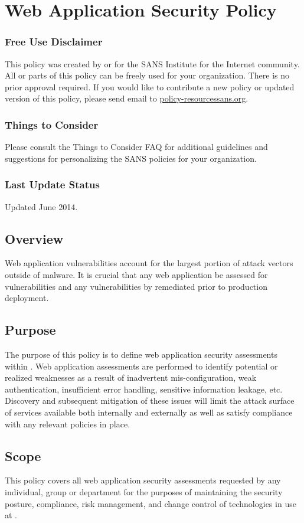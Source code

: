 \chapter{Web Application Security Policy}
\setcounter{section}{0}
\subsection*{Free Use Disclaimer}
This policy was created by or for the SANS Institute for the Internet community.  
All or parts of this policy can be freely used for your organization.  
There is no prior approval required. If you would like to contribute a new policy or updated version of this policy, please send email to \href{mailto:policy-resources@sans.org}{policy-resources\at{}sans.org}.
\subsection*{Things to Consider}
Please consult the Things to Consider FAQ for additional guidelines and suggestions for personalizing the SANS policies for your organization.  
\subsection*{Last Update Status}
Updated June 2014.  
\section{Overview}
Web application vulnerabilities account for the largest portion of attack vectors outside of malware.  
It is crucial that any web application be assessed for vulnerabilities and any vulnerabilities by remediated prior to production deployment.
\section{Purpose}
The purpose of this policy is to define web application security assessments within \CompanyName{}.  
Web application assessments are performed to identify potential or realized weaknesses as a result of inadvertent mis-configuration, weak authentication, insufficient error handling, sensitive information leakage, etc.  
Discovery and subsequent mitigation of these issues will limit the attack surface of \CompanyName{} services available both internally and externally as well as satisfy compliance with any relevant policies in place.
\section{Scope}
This policy covers all web application security assessments requested by any individual, group or department for the purposes of maintaining the security posture, compliance, risk management, and change control of technologies in use at \CompanyName{}.

